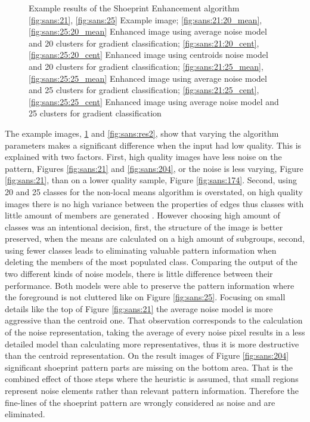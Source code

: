 \documentclass[draft,final]{vutinfth} %
\begin{document}
{\begin{figure}[H]
\caption{Example results of the Shoeprint Enhancement algorithm
				\ref{fig:sans:21}, \ref{fig:sans:25} Example image; \ref{fig:sans:21:20_mean}, \ref{fig:sans:25:20_mean} Enhanced image using average noise model and 20 clusters for gradient classification; \ref{fig:sans:21:20_cent}, \ref{fig:sans:25:20_cent} Enhanced image using centroids noise model and 20 clusters for gradient classification; \ref{fig:sans:21:25_mean}, \ref{fig:sans:25:25_mean} Enhanced image using average noise model and 25 clusters for gradient classification; \ref{fig:sans:21:25_cent}, \ref{fig:sans:25:25_cent} Enhanced image using average noise model and 25 clusters for gradient classification}
\label{fig:sans:res1}

\end{figure}
}


\par
The example images,  \ref{fig:sans:res1} and \ref{fig:sans:res2}, show that varying the algorithm parameters makes a significant difference when the input had low quality.
This is explained with two factors.
First, high quality images have less noise on the pattern, Figures \ref{fig:sans:21} and \ref{fig:sans:204}, or the noise is less varying, Figure \ref{fig:sans:21}, than on a lower quality sample, Figure \ref{fig:sans:174}.
Second, using 20 and 25 classes for the non-local means algorithm is overstated, on high quality images there is no high variance between the properties of edges thus classes with little amount of members are generated .
However choosing high amount of classes was an intentional decision, first, the structure of the image is better preserved, when the means are calculated on a high amount of subgroups, second, using fewer classes leads to eliminating valuable pattern information when deleting the members of the most populated class.
Comparing the output of the two different kinds of noise models, there is little difference between their performance.
Both models were able to preserve the pattern information where the foreground is not cluttered like on Figure \ref{fig:sans:25}.
Focusing on small details like the top of Figure \ref{fig:sans:21} the average noise model is more aggressive than the centroid one.
That observation corresponds to the calculation of the noise representation, taking the average of every noise pixel results in a less detailed model than calculating more representatives, thus it is more destructive than the centroid representation.
On the result images of Figure \ref{fig:sans:204} significant shoeprint pattern parts are missing on the bottom area.
That is the combined effect of those steps where the heuristic is assumed, that small regions represent noise elements rather than relevant pattern information.
Therefore the fine-lines of the shoeprint pattern are wrongly considered as noise and are eliminated.
\end{document}
